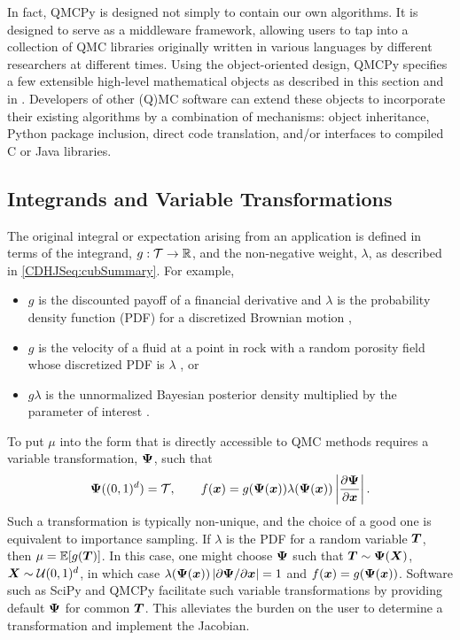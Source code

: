 \documentclass[graybox]{svmult}
\begin{document}
In fact, QMCPy is designed not simply to contain our own algorithms.  It is designed to serve as a middleware framework, allowing users to tap into a collection of QMC libraries originally written in various languages by different researchers at different times. Using the object-oriented design, QMCPy specifies a few  extensible high-level mathematical objects as described in this section and in \cite{ChoEtal22a}. Developers of other (Q)MC software can  extend these objects to incorporate their existing algorithms by a combination of mechanisms: object inheritance, Python package inclusion, direct code translation, and/or interfaces to compiled C or Java libraries.


\subsection{Integrands and Variable Transformations} \label{CDHJS:sec:integrands}
The original integral or expectation arising from an application is defined in terms of the integrand, $g :\mathcal{T} \to {\mathbb{R}}$, and the non-negative weight, $\lambda$, as described in \eqref{CDHJSeq:cubSummary}.  For example,
\begin{itemize}
	\item $g$ is the discounted payoff of a financial derivative and $\lambda$ is the probability density function (PDF) for a discretized Brownian motion \cite{Gla03},

	\item  $g$ is the velocity of a fluid at a point in rock with a random porosity field whose discretized PDF is $\lambda$ \cite{KuoNuy16a}, or

	\item $g\lambda$ is the unnormalized Bayesian posterior density multiplied by the parameter of interest \cite{GelEtal13}.
\end{itemize}

To put $\mu$ into the form that is directly accessible to QMC methods requires a variable transformation, ${\boldsymbol{\Psi}}$, such that
\begin{equation*}
    {\boldsymbol{\Psi}}((0,1)^d) = {\mathcal{T}}, \qquad f({\boldsymbol{x}}) = g({\boldsymbol{\Psi}}({\boldsymbol{x}})) \lambda({\boldsymbol{\Psi}}({\boldsymbol{x}})) \left\vert\frac{\partial {\boldsymbol{\Psi}}}{\partial{\boldsymbol{x}}}\right\vert.
\end{equation*}
Such a transformation is typically non-unique, and the choice of a good one is equivalent to importance sampling.  If $\lambda$ is the PDF for a random variable ${\boldsymbol{T}}$, then $\mu = {\mathbb{E}}[g({\boldsymbol{T}})]$.  In this case, one might choose ${\boldsymbol{\Psi}}$ such that ${\boldsymbol{T}} \sim {\boldsymbol{\Psi}}({\boldsymbol{X}})$, ${\boldsymbol{X}} \sim {\mathcal{U}}(0,1)^d$, in which case $\lambda({\boldsymbol{\Psi}}({\boldsymbol{x}})) \left\vert\partial {\boldsymbol{\Psi}}/\partial{\boldsymbol{x}}\right\vert = 1$ and $f({\boldsymbol{x}}) = g({\boldsymbol{\Psi}}({\boldsymbol{x}}))$. Software such as SciPy and QMCPy facilitate such variable transformations by providing default ${\boldsymbol{\Psi}}$ for common ${\boldsymbol{T}}$. This alleviates the burden on the user to determine a transformation and implement the Jacobian.
\end{document}
